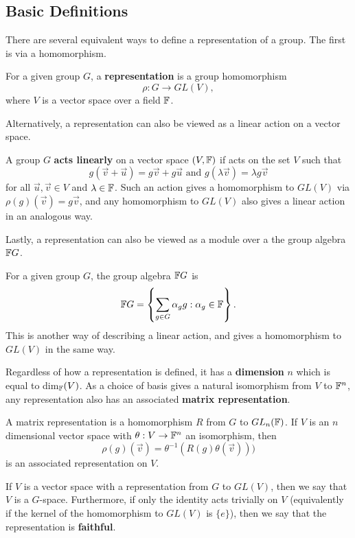 \documentclass[a4paper]{article}
\begin{document}
\subsection{Basic Definitions}
There are several equivalent ways to define a representation of a group. The first is via a homomorphism.
\begin{defi}[Representation]
    For a given group $G$, a \textbf{representation} is a group homomorphism $$\rho: G \to GL(V),$$ where $V$ is a vector space over a field $\mathbb{F}$. 
\end{defi}

Alternatively, a representation can also be viewed as a linear action on a vector space.
\begin{defi}
    A group $G$ \textbf{acts linearly} on a vector space $(V, \mathbb{F})$ if acts on the set $V$ such that $$g(\vec{v}+ \vec{u}) = g\vec{v} + g\vec{u} \text{ and } g(\lambda \vec{v}) = \lambda g\vec{v}$$
    for all $\vec{u}, \vec{v} \in V$ and $\lambda \in \mathbb{F}$. Such an action gives a homomorphism to $GL(V)$ via $\rho(g)(\vec{v}) = g\vec{v}$, and any homomorphism to $GL(V)$ also gives a linear action in an analogous way.
\end{defi}

Lastly, a representation can also be viewed as a module over a the group algebra $\mathbb{F} G$.
\begin{defi}
    For a given group $G$, the group algebra $\mathbb{F} G$ is 
    $$\mathbb{F} G = \left\{ \sum_{g \in G} \alpha_g g: \alpha_g \in \mathbb{F} \right\}.$$ This is another way of describing a linear action, and gives a homomorphism to $GL(V)$ in the same way.
\end{defi}

Regardless of how a representation is defined, it has a \textbf{dimension} $n$ which is equal to dim$_{\mathbb{F}}(V)$. As a choice of basis gives a natural isomorphism from $V$ to $\mathbb{F}^n$, any representation also has an associated \textbf{matrix representation}. 
\begin{defi}
    A matrix representation is a homomorphism $R$ from $G$ to $GL_n(\mathbb{F})$. If $V$ is an $n$ dimensional vector space with $\theta: V \to \mathbb{F}^n$ an isomorphism, then $$\rho(g)(\vec{v}) =  \theta^{-1}(R(g)\theta(\vec{v})))$$ is an associated representation on $V$. 
\end{defi}

If $V$ is a vector space with a representation from $G$ to $GL(V)$, then we say that $V$ is a $G$-space. Furthermore, if only the identity acts trivially on $V$ (equivalently if the kernel of the homomorphism to $GL(V)$ is $\{e\}$), then we say that the representation is \textbf{faithful}.
\end{document}
